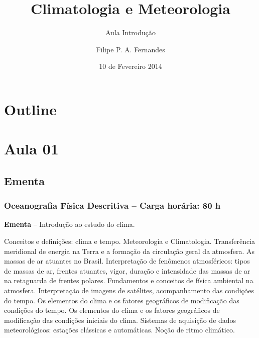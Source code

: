 \title[Aula 02]{Climatologia e Meteorologia}
\subtitle{Aula Introdução}
\author[Filipe Fernandes]{Filipe P. A. Fernandes}
\date[Fevereiro 2014]{10 de Fevereiro 2014}




\begin{frame}[plain]
  \titlepage
\end{frame}

\section*{Outline}
\begin{frame}
\tableofcontents
\end{frame}


\section{Aula 01}
\subsection{Ementa}
\begin{frame}
    \frametitle{Oceanografia Física Descritiva -- Carga horária: 80 h}
    {\bf Ementa} -- Introdução ao estudo do clima.
    {\scriptsize
    \begin{block}{}
    Conceitos e definições: clima e tempo.
    Meteorologia e Climatologia.  Transferência meridional de energia na Terra e
    a formação da circulação geral da atmosfera.  As massas de ar atuantes no
    Brasil.  Interpretação de fenômenos atmosféricos: tipos de massas de ar,
    frentes atuantes, vigor, duração e intensidade das massas de ar na
    retaguarda de frentes polares.  Fundamentos e conceitos de física ambiental
    na atmosfera.  Interpretação de imagens de satélites, acompanhamento das
    condições do tempo.  Os elementos do clima e os fatores geográficos de
    modificação das condições do tempo.  Os elementos do clima e os fatores
    geográficos de modificação das condições iniciais do clima.  Sistemas de
    aquisição de dados meteorológicos: estações clássicas e automáticas.
    Noção de ritmo climático.
    \end{block}
    }
\end{frame}

